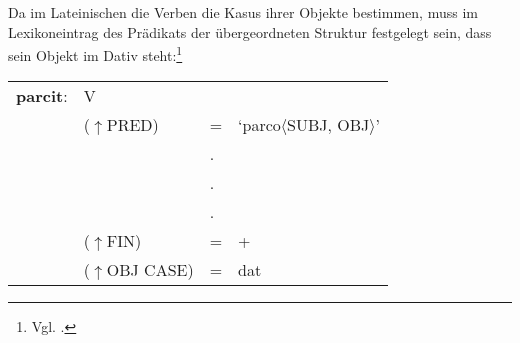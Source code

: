 \documentclass[12pt,a4paper]{article}
\begin{document}
Da im Lateinischen die Verben die Kasus ihrer Objekte bestimmen, muss im Lexikoneintrag des Prädikats der übergeordneten Struktur festgelegt sein, dass sein Objekt im Dativ steht:\footnote{Vgl. \cite[48]{Skript}.} \\
\begin{singlespace}
\begin{tabular}{ l  l  l  l  } 
\textbf{parcit}: & \: V \\
$\qquad$ & \:  ($\uparrow$PRED) & = & `parco$\langle$SUBJ, OBJ$\rangle$' \\
$\qquad$ & $\qquad$ & . \\
$\qquad$ & $\qquad$ & . \\
$\qquad$ & $\qquad$ & . \\
$\qquad$ & \:  ($\uparrow$FIN) & = & + \\
$\qquad$ & \:  ($\uparrow$OBJ CASE) & = & dat \\
\end{tabular}
\newline
\newline
\newline
\end{singlespace}

\end{document}

